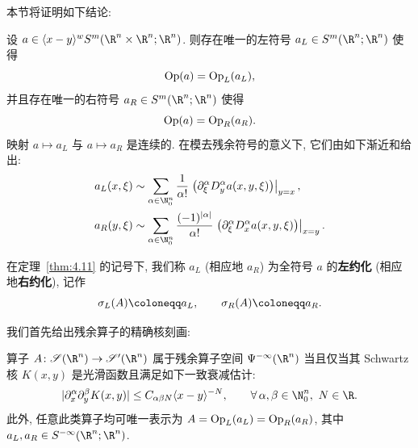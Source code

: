 本节将证明如下结论:

\begin{theorem}[左/右约化定理]\label{thm:4.11}
设 $a \in \langle x - y \rangle^w S^m(\R^n \times \R^n; \R^n)$. 则存在唯一的左符号 $a_L \in S^m(\R^n; \R^n)$ 使得
\begin{equation}\label{eq:4.48}
    \operatorname{Op}(a) = \operatorname{Op}_L(a_L),
\end{equation}
并且存在唯一的右符号 $a_R \in S^m(\R^n; \R^n)$ 使得
\begin{equation}\label{eq:4.49}
    \operatorname{Op}(a) = \operatorname{Op}_R(a_R).
\end{equation}
映射 $a \mapsto a_L$ 与 $a \mapsto a_R$ 是连续的. 在模去残余符号的意义下, 它们由如下渐近和给出:
\begin{align}
    a_L(x, \xi) &\sim \sum_{\alpha \in \N_0^n} \frac{1}{\alpha!} \left. \left( \partial_\xi^\alpha D_y^\alpha a(x, y, \xi) \right) \right|_{y = x}, \label{eq:4.50} \\
    a_R(y, \xi) &\sim \sum_{\alpha \in \N_0^n} \frac{(-1)^{|\alpha|}}{\alpha!} \left. \left( \partial_\xi^\alpha D_x^\alpha a(x, y, \xi) \right) \right|_{x = y}. \label{eq:4.51}
\end{align}
\end{theorem}

\begin{definition}[左/右约化符号]\label{def:4.12}
在定理~\ref{thm:4.11} 的记号下, 我们称 $a_L$ (相应地 $a_R$) 为全符号 $a$ 的\textbf{左约化} (相应地\textbf{右约化}), 记作
\begin{equation}\label{eq:4.52}
    \sigma_L(A) \defeq a_L, \qquad \sigma_R(A) \defeq a_R.
\end{equation}
\end{definition}

我们首先给出残余算子的精确核刻画:

\begin{proposition}\label{prop:4.13}
算子 $A \colon \Schwartz(\R^n) \to \TempDistr(\R^n)$ 属于残余算子空间 $\Psi^{-\infty}(\R^n)$ 当且仅当其 Schwartz 核 $K(x, y)$ 是光滑函数且满足如下一致衰减估计:
\begin{equation}\label{eq:4.53}
    |\partial_x^\alpha \partial_y^\beta K(x, y)| \le C_{\alpha\beta N} \langle x - y \rangle^{-N}, \qquad \forall\,\alpha, \beta \in \N_0^n, \ N \in \R.
\end{equation}
此外, 任意此类算子均可唯一表示为 $A = \operatorname{Op}_L(a_L) = \operatorname{Op}_R(a_R)$, 其中 $a_L, a_R \in S^{-\infty}(\R^n; \R^n)$.
\end{proposition}

